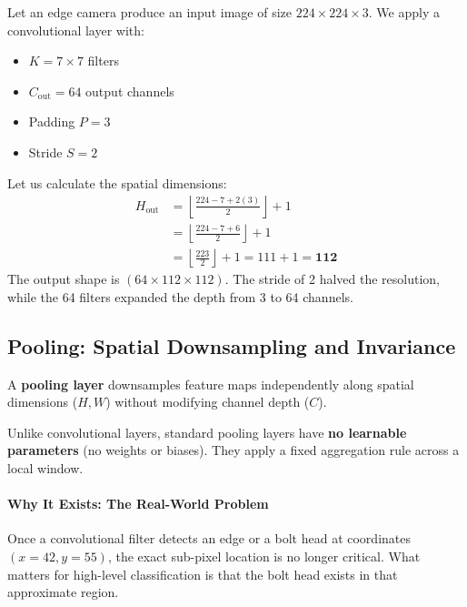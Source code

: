 \begin{example}
Let an edge camera produce an input image of size $224 \times 224 \times 3$. We apply a convolutional layer with:
\begin{itemize}
    \item $K = 7 \times 7$ filters
    \item $C_{\text{out}} = 64$ output channels
    \item Padding $P = 3$
    \item Stride $S = 2$
\end{itemize}
Let us calculate the spatial dimensions:
\begin{align*}
H_{\text{out}} &= \left\lfloor \frac{224 - 7 + 2(3)}{2} \right\rfloor + 1 \\
               &= \left\lfloor \frac{224 - 7 + 6}{2} \right\rfloor + 1 \\
               &= \left\lfloor \frac{223}{2} \right\rfloor + 1 = 111 + 1 = \mathbf{112}
\end{align*}
The output shape is $(64 \times 112 \times 112)$. The stride of 2 halved the resolution, while the 64 filters expanded the depth from 3 to 64 channels.
\end{example}

\subsection{Pooling: Spatial Downsampling and Invariance}\label{subsec:pooling}

\begin{keyidea}
A \textbf{pooling layer} downsamples feature maps independently along spatial dimensions ($H, W$) without modifying channel depth ($C$). 

Unlike convolutional layers, standard pooling layers have \textbf{no learnable parameters} (no weights or biases). They apply a fixed aggregation rule across a local window.
\end{keyidea}

\paragraph{Why It Exists: The Real-World Problem}
Once a convolutional filter detects an edge or a bolt head at coordinates $(x=42, y=55)$, the exact sub-pixel location is no longer critical. What matters for high-level classification is that the bolt head exists in that approximate region. 

